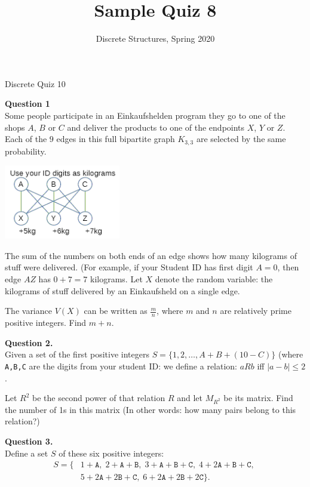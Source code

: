 \documentclass[jou]{apa6}
\title{Sample Quiz 8}
\author{Discrete Structures, Spring 2020}
\affiliation{RBS}
\begin{document}
\thispagestyle{empty}

\twocolumn
{\Large Discrete Quiz 10}

\vspace{6pt}
{\bf Question 1}\\
Some people participate in an Einkaufshelden program \textendash{} they go 
to one of the shops $A$, $B$ or $C$ and deliver the products to one of the endpoints
$X$, $Y$ or $Z$. Each of the $9$ edges in this full bipartite graph 
$K_{3,3}$ are selected by the same probability. 
\begin{center}
\includegraphics[width=2in]{quiz10.png}
\end{center}
The sum of the numbers on both ends of an edge shows 
how many kilograms of stuff were delivered. (For example, if your Student ID has 
first digit $A=0$, then edge $AZ$ has $0+7 = 7$ kilograms.
Let $X$ denote the random variable: the kilograms of stuff delivered by an Einkaufsheld 
on a single edge.

The variance $V(X)$ can be written as $\frac{m}{n}$, where $m$ and $n$ are relatively 
prime positive integers. Find $m + n$.


\vspace{6pt}
{\bf Question 2.}\\
Given a set of the first positive integers $S = \{ 1,2,\ldots,A+B+(10-C) \}$
(where {\tt A,B,C} are the digits from your student ID:
we define a relation: $aRb$ iff $|a - b| \leq 2$. 

Let $R^2$ be the second power of that relation $R$ and let $M_{R^2}$
be its matrix. Find the number of 1s in this matrix (In other words: 
how many pairs belong to this relation?)


\vspace{6pt}
{\bf Question 3.}\\
Define a set $S$ of these six positive integers: 
\begin{align}
S = \{ & 1+\mathtt{A},\; 2+\mathtt{A}+\mathtt{B},\; 3+\mathtt{A}+\mathtt{B}+\mathtt{C},\;
4 + 2\mathtt{A}+\mathtt{B}+\mathtt{C},\; \nonumber \\
 & 5 + 2\mathtt{A}+2\mathtt{B}+\mathtt{C},\;
6 + 2\mathtt{A}+2\mathtt{B}+2\mathtt{C}\}. \nonumber
\end{align}
\end{document}
